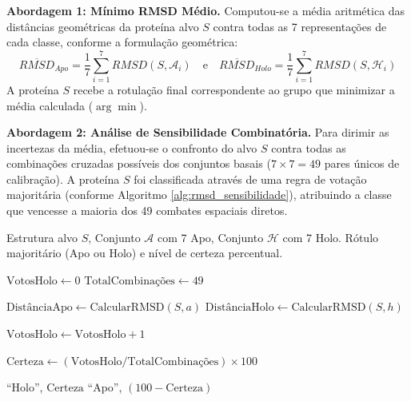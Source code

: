 \documentclass[12pt, a4paper]{article}
\theoremstyle{plain}
\theoremstyle{definition}
\theoremstyle{remark}
\begin{document}
\textbf{Abordagem 1: Mínimo RMSD Médio.} Computou-se a média aritmética das distâncias geométricas da proteína alvo $S$ contra todas as 7 representações de cada classe, conforme a formulação geométrica:
\begin{equation*}
    \overline{RMSD}_{Apo} = \frac{1}{7} \sum_{i=1}^{7} RMSD(S, \mathcal{A}_i) \quad \text{e} \quad \overline{RMSD}_{Holo} = \frac{1}{7} \sum_{i=1}^{7} RMSD(S, \mathcal{H}_i)
\end{equation*}
A proteína $S$ recebe a rotulação final correspondente ao grupo que minimizar a média calculada ($\arg\min$).

\textbf{Abordagem 2: Análise de Sensibilidade Combinatória.} Para dirimir as incertezas da média, efetuou-se o confronto do alvo $S$ contra todas as combinações cruzadas possíveis dos conjuntos basais ($7 \times 7 = 49$ pares únicos de calibração). A proteína $S$ foi classificada através de uma regra de votação majoritária (conforme Algoritmo \ref{alg:rmsd_sensibilidade}), atribuindo a classe que vencesse a maioria dos 49 combates espaciais diretos.

\begin{algorithm}[H]
\caption{Classificação Geométrica (Abordagem de Sensibilidade Combinatória)}
\label{alg:rmsd_sensibilidade}
\begin{algorithmic}[1]
\Require Estrutura alvo $S$, Conjunto $\mathcal{A}$ com 7 Apo, Conjunto $\mathcal{H}$ com 7 Holo.
\Ensure Rótulo majoritário (Apo ou Holo) e nível de certeza percentual.

\State $\text{VotosHolo} \leftarrow 0$
\State $\text{TotalCombinações} \leftarrow 49$

        \State $\text{DistânciaApo} \leftarrow \text{CalcularRMSD}(S, a)$
        \State $\text{DistânciaHolo} \leftarrow \text{CalcularRMSD}(S, h)$
        
            \State $\text{VotosHolo} \leftarrow \text{VotosHolo} + 1$
        \EndIf
    \EndFor
\EndFor

\State $\text{Certeza} \leftarrow (\text{VotosHolo} / \text{TotalCombinações}) \times 100$

    \State \Return \enquote{Holo}, $\text{Certeza}$
\Else
    \State \Return \enquote{Apo}, $(100 - \text{Certeza})$
\EndIf
\end{algorithmic}
\end{algorithm}
\end{document}
